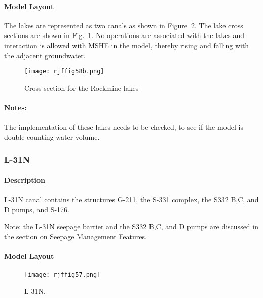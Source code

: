 \paragraph{Model Layout}
The lakes are represented as two canals as shown in Figure~\ref{fig:rjffig57}. The lake cross sections are shown in Fig.~\ref{fig:rjffig58b}. No operations are associated with the lakes and interaction is allowed with MSHE in the model, thereby rising and falling with the adjacent groundwater.

\begin{figure}[!h]
  \begin{center}
  \texttt{[image: rjffig58b.png]}
  \caption{Cross section for the Rockmine lakes}
  \label{fig:rjffig58b}
  \end{center}
\end{figure}

\begin{notes}
\paragraph{Notes:}
The implementation of these lakes needs to be checked, to see if the model is double-counting water volume.
\end{notes}


\clearpage
\subsubsection{L-31N}
\paragraph{Description}
L-31N canal contains the structures G-211, the S-331 complex, the S332 B,C, and D pumps, and S-176.


Note: the L-31N seepage barrier and the S332 B,C, and D pumps are discussed in the section on Seepage Management Features.


\paragraph{Model Layout}

\begin{figure}[!h]
  \begin{center}
  \texttt{[image: rjffig57.png]}
  \caption{L-31N.}
  \label{fig:rjffig57}
  \end{center}
\end{figure}

